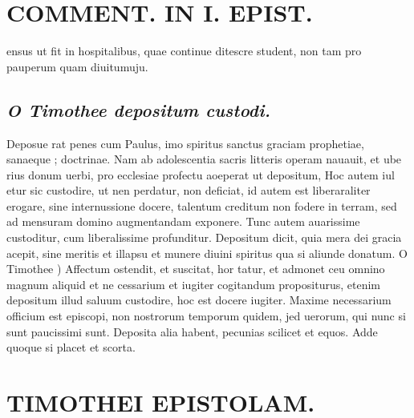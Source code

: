 \documentclass{article}
\begin{document}
\begin{pages}
\section*{COMMENT. IN I. EPIST. }
\marginpar{[ p.186 ]}\pstart ensus ut fit in hospitalibus, quae continue ditescre student, non tam pro pauperum quam diuitumuju.  \pend
{}
{}
\subsection*{\textit{O Timothee depositum custodi. }}\pstart Deposue rat penes cum Paulus, imo spiritus sanctus graciam prophetiae, sanaeque ; doctrinae. Nam ab adolescentia sacris litteris operam nauauit, et ube rius donum uerbi, pro ecclesiae profectu aoeperat ut depositum, Hoc autem iul etur sic custodire, ut nen perdatur, non deficiat, id autem est liberaraliter erogare, sine internussione docere, talentum creditum non fodere in terram, sed ad mensuram domino augmentandam exponere. Tunc autem auarissime custoditur, cum liberalissime profunditur.  \pend\pstart Depositum dicit, quia mera dei gracia acepit, sine meritis et illapsu et munere diuini spiritus qua si aliunde donatum.  \pend\pstart O Timothee ) Affectum ostendit, et suscitat, hor tatur, et admonet ceu omnino magnum aliquid et ne cessarium et iugiter cogitandum propositurus, etenim depositum illud saluum custodire, hoc est docere iugiter. Maxime necessarium officium est episcopi, non nostrorum temporum quidem, jed uerorum, qui nunc si sunt paucissimi sunt. Deposita alia habent, pecunias scilicet et equos. Adde quoque si placet et scorta.  \pend
\section*{TIMOTHEI EPISTOLAM. }
\marginpar{[ p.187 ]}
{}

\end{pages}
\end{document}
